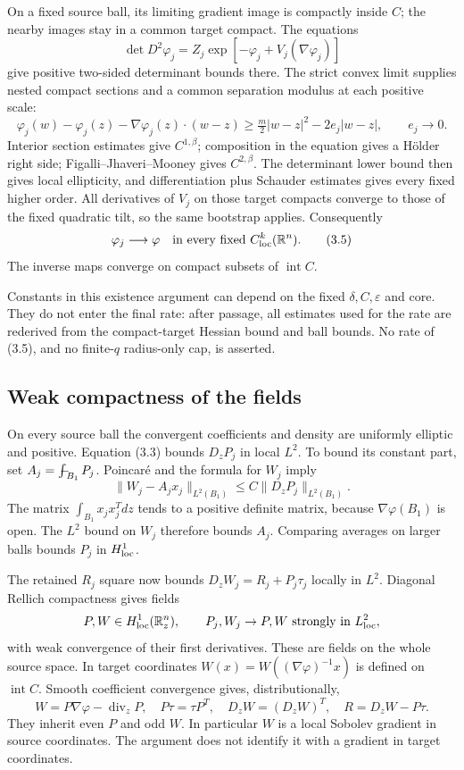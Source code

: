 \documentclass[11pt,reqno]{amsart}
\numberwithin{equation}{section}
\theoremstyle{remark}
\theoremstyle{definition}
\newcommand{\fint}{\mathop{\rlap{\hspace{0.15em}$-$}\!\int}\nolimits}
\begin{document}
On a fixed source ball, its limiting gradient image is compactly inside \(C\); the nearby images stay in a common target compact. The equations
\[
\det D^2\varphi_j=Z_j\exp[-\varphi_j+V_j(\nabla\varphi_j)]
\]
give positive two-sided determinant bounds there. The strict convex limit supplies nested compact sections and a common separation modulus at each positive scale:
\[
\varphi_j(w)-\varphi_j(z)-\nabla\varphi_j(z)\cdot(w-z)
\ge \tfrac m2|w-z|^2-2e_j|w-z|,\qquad e_j\to0.
\]
Interior section estimates give \(C^{1,\beta}\); composition in the equation gives a H\"older right side; Figalli--Jhaveri--Mooney \cite[Theorem 1.1]{FJM} gives \(C^{2,\beta}\). The determinant lower bound then gives local ellipticity, and differentiation plus Schauder estimates gives every fixed higher order. All derivatives of \(V_j\) on those target compacts converge to those of the fixed quadratic tilt, so the same bootstrap applies. Consequently
\[
\varphi_j\longrightarrow\varphi\quad\hbox{in every fixed }C^k_{\rm loc}(\mathbb R^n).
                                                                    \tag{3.5}
\]
The inverse maps converge on compact subsets of \(\operatorname{int}C\).

Constants in this existence argument can depend on the fixed \(\delta,C,\varepsilon\) and core. They do not enter the final rate: after passage, all estimates used for the rate are rederived from the compact-target Hessian bound and ball bounds. No rate of (3.5), and no finite-\(q\) radius-only cap, is asserted.

\subsection{Weak compactness of the fields}

On every source ball the convergent coefficients and density are uniformly elliptic and positive. Equation (3.3) bounds \(D_zP_j\) in local \(L^2\). To bound its constant part, set \(A_j=\fint_{B_1}P_j\). Poincar\'e and the formula for \(W_j\) imply
\[
\|W_j-A_jx_j\|_{L^2(B_1)}
\le C\|D_zP_j\|_{L^2(B_1)}.
\]
The matrix \(\int_{B_1}x_jx_j^Tdz\) tends to a positive definite matrix, because \(\nabla\varphi(B_1)\) is open. The \(L^2\) bound on \(W_j\) therefore bounds \(A_j\). Comparing averages on larger balls bounds \(P_j\) in \(H^1_{\rm loc}\).

The retained \(R_j\) square now bounds \(D_zW_j=R_j+P_j\tau_j\) locally in \(L^2\). Diagonal Rellich compactness gives fields
\[
P,W\in H^1_{\rm loc}(\mathbb R^n_z),\qquad
P_j,W_j\to P,W\ \hbox{strongly in }L^2_{\rm loc},
\]
with weak convergence of their first derivatives. These are fields on the whole source space. In target coordinates \(W(x)=W((\nabla\varphi)^{-1}x)\) is defined on \(\operatorname{int}C\). Smooth coefficient convergence gives, distributionally,
\[
W=P\nabla\varphi-\operatorname{div}_zP,\quad
P\tau=\tau P^T,\quad D_zW=(D_zW)^T,\quad R=D_zW-P\tau.                 \tag{3.6}
\]
They inherit even \(P\) and odd \(W\). In particular \(W\) is a local Sobolev gradient in source coordinates. The argument does not identify it with a gradient in target coordinates.
\end{document}

